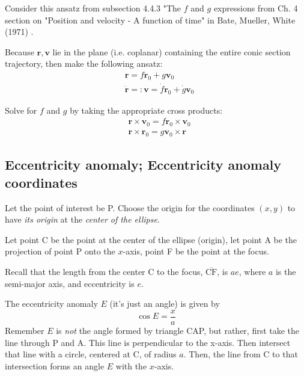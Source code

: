 \documentclass[10pt]{amsart}
\begin{document}
\begin{multicols*}{2}
Consider this ansatz from subsection 4.4.3 "The $f$ and $g$ expressions from Ch. 4 section on "Position and velocity - A function of time" in Bate, Mueller, White (1971) \cite{BMW1971}. 

Because $\mathbf{r}, \mathbf{v}$ lie in the plane (i.e. coplanar) containing the entire conic section trajectory, then make the following ansatz:
\begin{equation}
\begin{aligned}
& \mathbf{r} = f\mathbf{r}_0 + g \mathbf{v}_0 \\ 
& \dot{\mathbf{r}} =: \mathbf{v} = \dot{f} \mathbf{r}_0 + \dot{g} \mathbf{v}_0
\end{aligned} 
\end{equation}

Solve for $f$ and $g$ by taking the appropriate cross products:
\begin{equation}\label{Eq:fAndgSeparatedByCrossProducts}
\begin{aligned} 
	& \mathbf{r} \times \mathbf{v}_0 = f\mathbf{r}_0 \times \mathbf{v}_0 \\ 
	& \mathbf{r} \times \mathbf{r}_0 = g \mathbf{v}_0 \times \mathbf{r} 
\end{aligned}
\end{equation}

\subsection{Eccentricity anomaly; Eccentricity anomaly coordinates}

Let the point of interest be P. Choose the origin for the coordinates $(x, y)$ to have \emph{its origin} at the \emph{center of the ellipse}. %

Let point C be the point at the center of the ellipse (origin), let point A be the projection of point P onto the $x$-axis, point F be the point at the focus.

Recall that the length from the center C to the focus, $\overline{\text{CF}}$, is $ae$, where $a$ is the semi-major axis, and eccentricity is $e$. 

The eccentricity anomaly $E$ (it's just an angle) is given by
\begin{equation}
\cos{E} = \frac{x}{a}
\end{equation}
Remember $E$ is \emph{not} the angle formed by triangle CAP, but rather, first take the line through P and A. This line is perpendicular to the x-axis. Then intersect that line with a circle, centered at C, of radius $a$. Then, the line from C to that intersection forms an angle $E$ with the $x$-axis.


\end{multicols*}
\end{document}
